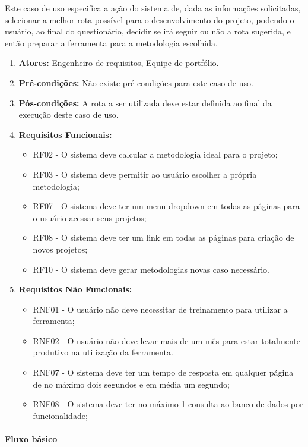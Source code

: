 Este caso de uso especifica a ação do sistema de, dada as informações solicitadas, selecionar a melhor rota possível para o desenvolvimento do projeto, podendo o usuário, ao final do questionário, decidir se irá seguir ou não a rota sugerida, e então preparar a ferramenta para a metodologia escolhida.

\begin{enumerate}
	\item \textbf{Atores:}
		Engenheiro de requisitos, Equipe de portfólio. 
	\item \textbf{Pré-condições:}
		Não existe pré condições para este caso de uso.
	\item \textbf{Pós-condições:}
		A rota a ser utilizada deve estar definida ao final da execução deste caso de uso.
	\item \textbf{Requisitos Funcionais:}
		\begin{itemize}
			\item RF02 - O sistema deve calcular a metodologia ideal para o projeto;
			\item RF03 - O sistema deve permitir ao usuário escolher a própria metodologia;
			\item RF07 - O sistema deve ter um menu dropdown em todas as páginas para o usuário acessar seus projetos;
			\item RF08 - O sistema deve ter um link em todas as páginas para criação de novos projetos;
			\item RF10 - O sistema deve gerar metodologias novas caso necessário.
		\end{itemize}
	\item \textbf{Requisitos Não Funcionais:}
		\begin{itemize}
			\item RNF01 - O usuário não deve necessitar de treinamento para utilizar a ferramenta;
			\item RNF02 - O usuário não deve levar mais de um mês para estar totalmente produtivo na utilização da ferramenta.
			\item RNF07 - O sistema deve ter um tempo de resposta em qualquer página de no máximo dois segundos e em média um segundo;
			\item RNF08 - O sistema deve ter no máximo 1 consulta ao banco de dados por funcionalidade;
		\end{itemize}
\end{enumerate}

\paragraph{Fluxo básico}

